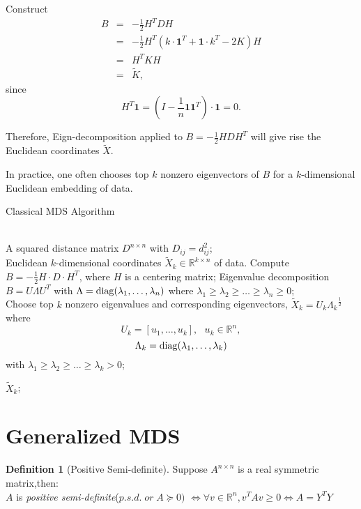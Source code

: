 \documentclass[twoside]{article}
\theoremstyle{definition}
\theoremstyle{definition}
\newtheorem*{defn}{Definition}
\theoremstyle{remark}
\def\R{{\mathbb R}}
\def\diag{{\rm diag}}
\begin{document}
Construct 
\begin{eqnarray*}
B &=& -\frac{1}{2} H^T D H \\
&=& -\frac{1}{2} H^T (k\cdot {\mathbf{1}}^T + \mathbf{1} \cdot k^T -2K)H \\
&=& H^T K H \\
&=& \tilde{K},
\end{eqnarray*}
since 
$$ H^T \mathbf{1} = (I - \frac{1}{n}\mathbf{1}\mathbf{1}^T)\cdot \mathbf{1} = 0.$$

Therefore, Eign-decomposition applied to $B = -\frac{1}{2}HDH^T$ will give rise the Euclidean coordinates $\tilde{X}$. 

In practice, one often chooses top $k$ nonzero eigenvectors of $B$ for a $k$-dimensional Euclidean embedding of data.


\begin{algorithm}[htb]   
\caption{Classical MDS Algorithm}   
\label{alg:cmds}   
\begin{algorithmic}[1] %
\REQUIRE ~~\\ %
A squared distance matrix $ D^{n\times n} $ with $D_{ij} = d_{ij}^2$;
\ENSURE ~~\\ %
Euclidean $k$-dimensional coordinates $\widetilde{X}_k\in \R^{k\times n}$ of data.
\STATE Compute $\displaystyle B = - \frac{1}{2} H \cdot D \cdot H^T $, where $H$ is a centering matrix;   
\STATE 
Eigenvalue decomposition\ $ B = U \Lambda U^T $ with $\Lambda=\diag(\lambda_1,\ldots,\lambda_n)$ where
$\lambda_1\geq \lambda_2\geq \ldots \geq\lambda_n\geq 0 $;\\ 
\STATE Choose top $k$ nonzero eigenvalues and corresponding eigenvectors, $ \widetilde{X}_k = U_k{\Lambda_k}^\frac{1}{2} $ where 
$$U_k=[u_1,\ldots,u_k], \ \ \ u_k\in \R^n,$$
$$\Lambda_k=\diag(\lambda_1,\ldots,\lambda_k)$$
with $\lambda_1\geq \lambda_2\geq \ldots \geq\lambda_k> 0 $;   

\RETURN $\widetilde{X}_k$; %
\end{algorithmic}
\end{algorithm}

\section{Generalized MDS}

\begin{defn}[Positive Semi-definite]
Suppose $A^{n\times n}$ is a real symmetric matrix,then:\\
$A$ is \emph{positive semi-definite}($p.s.d.\; or\; A\succeq 0)$ $\iff \forall v \in \R^n,v^TAv \geq 0 \iff A=Y^TY$
\end{defn}
\end{document}
